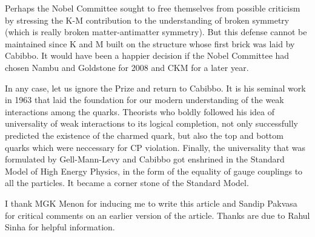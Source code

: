 Perhaps the Nobel Committee sought to free themselves from
possible criticism by stressing the K-M contribution to the 
understanding of broken symmetry (which is really
broken matter-antimatter symmetry). But this defense
cannot be maintained since K and M built on the structure
whose first brick was laid by Cabibbo. It would have been a
happier decision if the Nobel Committee had chosen Nambu
and Goldstone for 2008 and CKM for a later year.

In any case, let us ignore the Prize and return to Cabibbo. 
It is his seminal work in 1963 that laid the foundation for our
modern understanding of the weak interactions among the quarks.
Theorists who boldly followed his idea of universality of weak 
interactions to its logical completion, not only successfully
predicted the existence of the charmed quark, but also the top
and bottom quarks which were neccessary for CP violation.
Finally, the universality that was formulated by Gell-Mann-Levy 
and Cabibbo got enshrined in the Standard Model of High Energy 
Physics, in the form of the equality of gauge couplings to all 
the particles. It became a corner stone of the Standard Model. 

I thank MGK Menon for inducing me to write this article and
Sandip Pakvasa for critical comments on an earlier version
of the article. Thanks are due to Rahul Sinha for helpful
information.
